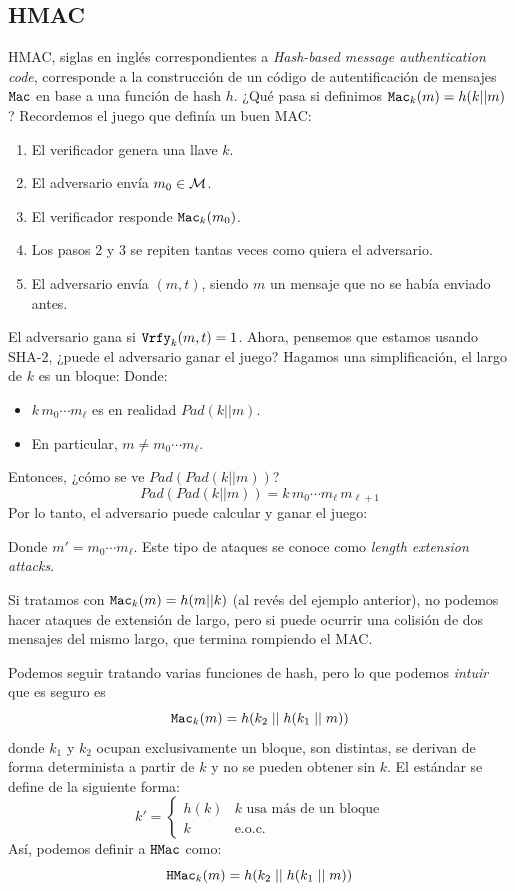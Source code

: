 \subsection{HMAC}
HMAC, siglas en inglés correspondientes a \textit{Hash-based message authentication code}, corresponde a la construcción de un código de autentificación de mensajes $\texttt{Mac}$ en base a una función de hash $h$. ¿Qué pasa si definimos $\texttt{Mac}_k(m) = h(k || m)$? Recordemos el juego que definía un buen MAC:
\begin{enumerate}
    \item El verificador genera una llave $k$.
    \item El adversario envía $m_0 \in \mathcal{M}$.
    \item El verificador responde $\texttt{Mac}_k(m_0)$.
    \item Los pasos 2 y 3 se repiten tantas veces como quiera el adversario.
    \item El adversario envía $(m,t)$, siendo $m$ un mensaje que no se había enviado antes.
\end{enumerate}
El adversario gana si $\texttt{Vrfy}_k(m,t) = 1$. Ahora, pensemos que estamos usando SHA-2, ¿puede el adversario ganar el juego? Hagamos una simplificación, el largo de $k$ es un bloque:
Donde:
\begin{itemize}
    \item $k \, m_0 \cdots m_\ell$ es en realidad $Pad(k||m)$.
    \item En particular, $m \neq m_0 \cdots m_\ell$. 
\end{itemize}
Entonces, ¿cómo se ve $Pad(Pad(k||m))$?
$$
Pad(Pad(k||m)) = k\,m_0 \cdots m_\ell \, m_{\ell + 1}
$$
Por lo tanto, el adversario puede calcular y ganar el juego:

Donde $m' = m_0 \cdots m_\ell$. Este tipo de ataques se conoce como \textit{length extension attacks}. \medbreak

Si tratamos con $\texttt{Mac}_k(m) = h(m||k)$ (al revés del ejemplo anterior), no podemos hacer ataques de extensión de largo, pero si puede ocurrir una colisión de dos mensajes del mismo largo, que termina rompiendo el MAC.

Podemos seguir tratando varias funciones de hash, pero lo que podemos \textit{intuir} que es seguro es
$$
\texttt{Mac}_k(m) = h(k_2 \mid\mid h(k_1 \mid\mid m))
$$
donde $k_1$ y $k_2$ ocupan exclusivamente un bloque, son distintas, se derivan de forma determinista a partir de $k$ y no se pueden obtener sin $k$. El estándar se define de la siguiente forma:
$$
k' = \begin{cases}
h(k) &k\text{ usa más de un bloque} \\
k &\text{e.o.c.}
\end{cases}
$$
Así, podemos definir a $\texttt{HMac}$ como:
$$
\texttt{HMac}_k(m) = h(k_2 \mid\mid h(k_1 \mid\mid m))
$$
